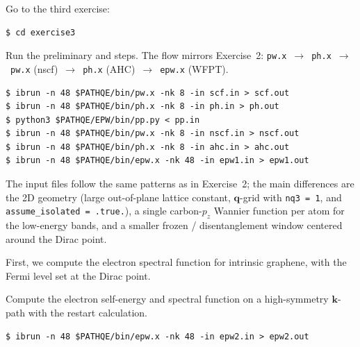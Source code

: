 \documentclass[a4paper,11pt,serif]{article}
\newcommand{\mb}[1]{\mathbf{#1}}
\begin{document}
\vspace{0.2cm}

\action Go to the third exercise:
\begin{verbatim}
$ cd exercise3
\end{verbatim}

\action Run the preliminary  and  steps. The flow mirrors Exercise~2: \texttt{pw.x}~$\to$~\texttt{ph.x}~$\to$~\texttt{pw.x} (nscf)~$\to$~\texttt{ph.x} (AHC)~$\to$~\texttt{epw.x} (WFPT).

\begin{verbatim}
$ ibrun -n 48 $PATHQE/bin/pw.x -nk 8 -in scf.in > scf.out
$ ibrun -n 48 $PATHQE/bin/ph.x -nk 8 -in ph.in > ph.out
$ python3 $PATHQE/EPW/bin/pp.py < pp.in
$ ibrun -n 48 $PATHQE/bin/pw.x -nk 8 -in nscf.in > nscf.out
$ ibrun -n 48 $PATHQE/bin/ph.x -nk 8 -in ahc.in > ahc.out
$ ibrun -n 48 $PATHQE/bin/epw.x -nk 48 -in epw1.in > epw1.out
\end{verbatim}

The input files follow the same patterns as in Exercise~2; the main differences are the 2D geometry (large out-of-plane lattice constant, $\mb{q}$-grid with \texttt{nq3 = 1}, and \texttt{assume\_isolated = .true.}), a single carbon-$p_z$ Wannier function per atom for the low-energy bands, and a smaller frozen / disentanglement window centered around the Dirac point.

\vspace{0.5cm}

First, we compute the electron spectral function for intrinsic graphene, with the Fermi level set at the Dirac point.

\vspace{0.2cm}

\action Compute the electron self-energy and spectral function on a high-symmetry $\mb{k}$-path with the  restart calculation.

\begin{verbatim}
$ ibrun -n 48 $PATHQE/bin/epw.x -nk 48 -in epw2.in > epw2.out
\end{verbatim}
\end{document}
